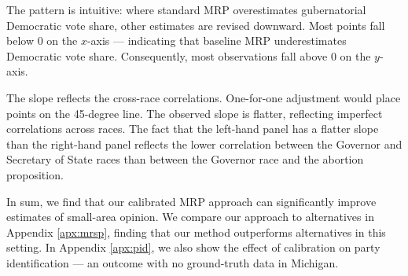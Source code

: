 The pattern is intuitive: where standard MRP overestimates gubernatorial Democratic vote share, other estimates are revised downward.
Most points fall below 0 on the $x$-axis --- indicating that baseline MRP underestimates Democratic vote share.
Consequently, most observations fall above 0 on the $y$-axis.

The slope reflects the cross-race correlations. One-for-one adjustment would place points on the 45-degree line. The observed slope is flatter, reflecting imperfect correlations across races.
The fact that the left-hand panel has a flatter slope than the right-hand panel reflects the lower correlation  between the Governor and Secretary of State races than between the Governor race and the abortion proposition.

In sum, we find that our calibrated MRP approach can significantly improve estimates of small-area opinion.
We compare our approach to alternatives in Appendix \ref{apx:mrsp}, finding that our method outperforms alternatives in this setting. 
In Appendix \ref{apx:pid}, we also show the effect of calibration on party identification --- an outcome with no ground-truth data in Michigan.
 
